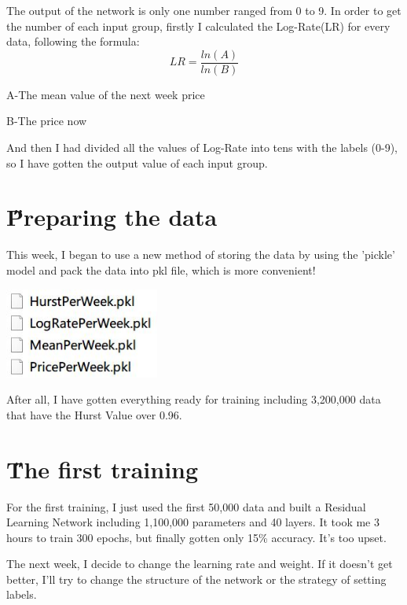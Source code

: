 \documentclass[12pt]{article}
\begin{document}
The output of the network is only one number ranged from 0 to 9. In order to get the number of each input group, firstly I calculated the Log-Rate(LR) for every data, following the formula:
$$LR = \frac{ln(A)}{ln(B)}$$

A-The mean value of the next week price

B-The price now

And then I had divided all the values of Log-Rate into tens with the labels (0-9), so I have gotten the output value of each input group.

\section{\H Preparing the data}
This week, I began to use a new method of storing the data by using the 'pickle' model and pack the data into pkl file, which is more convenient!

\begin{center} 
\includegraphics[width=2in]{1.jpg}
\end{center}

After all, I have gotten everything ready for training including 3,200,000 data that have the Hurst Value over 0.96.

\section{\H The first training}
For the first training, I just used the first 50,000 data and built a Residual Learning Network including 1,100,000 parameters and 40 layers. It took me 3 hours to train 300 epochs, but finally gotten only 15\% accuracy. It's too upset.

The next week, I decide to change the learning rate and weight. If it doesn't get better, I'll try to change the structure of the network or the strategy of setting labels.



\end{document}
